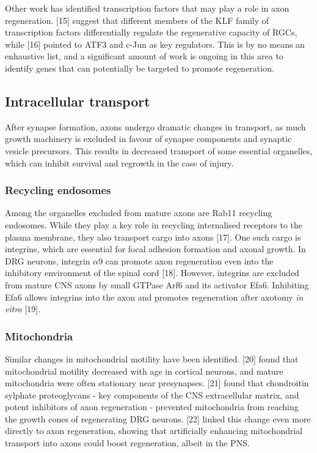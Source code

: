 \documentclass[
  12pt,
  a4paper,
]{book}
\begin{document}
Other work has identified transcription factors that may play a role in axon regeneration. {[}15{]} suggest that different members of the KLF family of transcription factors differentially regulate the regenerative capacity of RGCs, while {[}16{]} pointed to ATF3 and c-Jun as key regulators. This is by no means an enhaustive list, and a significant amount of work is ongoing in this area to identify genes that can potentially be targeted to promote regeneration.

\hypertarget{intracellular-transport}{%
\subsection{Intracellular transport}\label{intracellular-transport}}

After synapse formation, axons undergo dramatic changes in transport, as much growth machinery is excluded in favour of synapse components and synaptic vesicle precursors. This results in decreased transport of some essential organelles, which can inhibit survival and regrowth in the case of injury.

\hypertarget{recycling-endosomes}{%
\subsubsection{Recycling endosomes}\label{recycling-endosomes}}

Among the organelles excluded from mature axons are Rab11 recycling endosomes. While they play a key role in recycling internalised receptors to the plasma membrane, they also transport cargo into axons {[}17{]}. One such cargo is integrins, which are essential for focal adhesion formation and axonal growth. In DRG neurons, integrin \(\alpha9\) can promote axon regeneration even into the inhibitory environment of the spinal cord {[}18{]}. However, integrins are excluded from mature CNS axons by small GTPase Arf6 and its activator Efa6. Inhibiting Efa6 allows integrins into the axon and promotes regeneration after axotomy \emph{in vitro} {[}19{]}.

\hypertarget{mitochondria}{%
\subsubsection{Mitochondria}\label{mitochondria}}

Similar changes in mitochondrial motility have been identified. {[}20{]} found that mitochondrial motility decreased with age in cortical neurons, and mature mitochondria were often stationary near presynapses. {[}21{]} found that chondroitin sylphate proteoglycans - key components of the CNS extracellular matrix, and potent inhibitors of axon regeneration - prevented mitochondria from reaching the growth cones of regenerating DRG neurons. {[}22{]} linked this change even more directly to axon regeneration, showing that artificially enhancing mitochondrial transport into axons could boost regeneration, albeit in the PNS.
\end{document}
